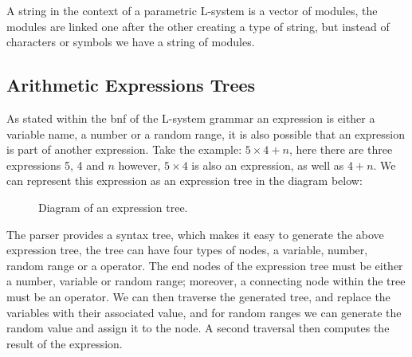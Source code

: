 \begin{flushleft}
\vspace{5mm}

A string in the context of a parametric L-system is a vector of modules, the modules are linked one after the other creating a type of string, but instead of characters or symbols we have a string of modules. \\

\end{flushleft}

\subsection{Arithmetic Expressions Trees}

\begin{flushleft}

As stated within the \acrshort{bnf} of the L-system grammar an expression is either a variable name, a number or a random range, it is also possible that an expression is part of another expression. Take the example: $5 \times 4 + n$, here there are three expressions 5, 4 and $n$ however, $5 \times 4$ is also an expression, as well as $4 + n$. We can represent this expression as an expression tree in the diagram below:


\begin{figure}[htbp]
	{\centering
		\setlength{\fboxrule}{1pt}
		\vspace{7px}
		\caption{Diagram of an expression tree.} \label{3D rotations}
	}
\end{figure}
\FloatBarrier

The parser provides a syntax tree, which makes it easy to generate the above expression tree, the tree can have four types of nodes, a variable, number, random range or a operator. The end nodes of the expression tree must be either a number, variable or random range; moreover, a connecting node within the tree must be an operator. We can then traverse the generated tree, and replace the variables with their associated value, and for random ranges we can generate the random value and assign it to the node. A second traversal then computes the result of the expression. \\
 


\end{flushleft}